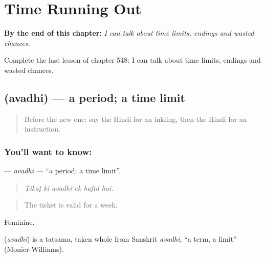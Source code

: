 
\chapter{Time Running Out}
\label{ch:hi-time-running-out}

\begin{chapteropening}
\textbf{By the end of this chapter:} \emph{I can talk about time limits, endings and wasted chances.}

Complete the last lesson of chapter 548: I can talk about time limits, endings and wasted chances.
\end{chapteropening}

\section[\texorpdfstring{\hi{अवधि} (avadhi)}{अवधि (avadhi)}]{ (avadhi) — a period; a time limit}

\label{lesson:HI-C548-avadhi}



\begin{quote}
Before the new one: say the Hindi for an inkling, then the Hindi for an instruction.
\end{quote}

\subsection*{You'll want to know: }
\textbf{} — \emph{avadhi} — \textquotedblleft{}a period; a time limit\textquotedblright{}.

\begin{quote}
     
\end{quote}

\begin{quote}
\emph{Ṭikaṭ kī avadhi ek haftā hai.}
\end{quote}

\begin{quote}
The ticket is valid for a week.
\end{quote}

Feminine.

\begin{cousinweb}
\textbf{} (\emph{avadhi}) is a tatsama, taken whole from Sanskrit \emph{avadhi}, \textquotedblleft{}a term, a limit\textquotedblright{} (Monier-Williams).
\end{cousinweb}

